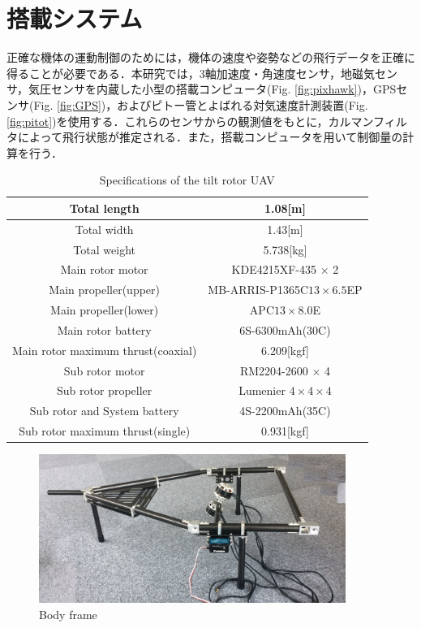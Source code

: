 \section{搭載システム}

正確な機体の運動制御のためには，機体の速度や姿勢などの飛行データを正確に得ることが必要である．本研究では，3軸加速度・角速度センサ，地磁気センサ，気圧センサを内蔵した小型の搭載コンピュータ(Fig. \ref{fig:pixhawk})，GPSセンサ(Fig. \ref{fig:GPS})，およびピトー管とよばれる対気速度計測装置(Fig. \ref{fig:pitot})を使用する．これらのセンサからの観測値をもとに，カルマンフィルタによって飛行状態が推定される．また，搭載コンピュータを用いて制御量の計算を行う．

\begin{table}[htb]
	\begin{center}
		\caption{Specifications of the tilt rotor UAV}
		\label{spec}
		\begin{tabular}{|c|c|}\hline
			Total length & 1.08[m] \\ \hline
			Total width & 1.43[m] \\ \hline
			Total weight & 5.738[kg]\\ \hline
			Main rotor motor & KDE4215XF-435 $\times$ 2\\ \hline
			Main propeller(upper) & MB-ARRIS-P1365C$13 \times 6.5$EP\\ \hline
			Main propeller(lower) & APC$13 \times 8.0$E\\ \hline
			Main rotor battery & 6S-6300mAh(30C)\\ \hline
			Main rotor maximum thrust(coaxial) & 6.209[kgf]\\ \hline
			Sub rotor motor & RM2204-2600 $\times$ 4\\ \hline
			Sub rotor propeller & Lumenier $4 \times 4 \times 4$\\ \hline
			Sub rotor and System battery & 4S-2200mAh(35C)\\ \hline
			Sub rotor maximum thrust(single) & 0.931[kgf]\\ \hline
		\end{tabular}
	\end{center}
\end{table}
\begin{figure}[hb]
	\begin{center}
		\includegraphics[clip,width=10.0cm,bb=0 0 500 300]{./z_figure_files/chapter2/9_frame.png}
		\caption{Body frame}
		\label{fig:frame}
	\end{center}
\end{figure}

